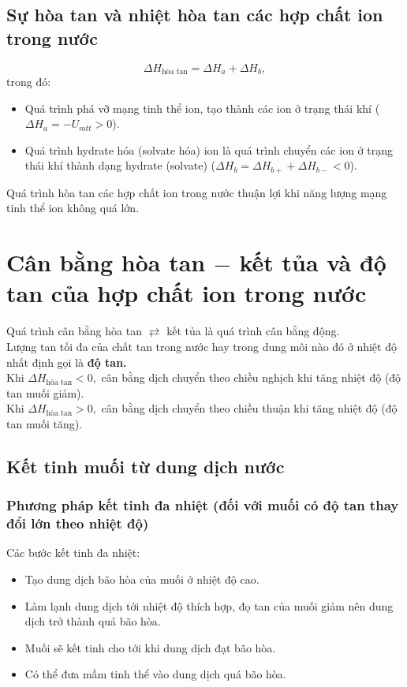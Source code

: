 \subsection{Sự hòa tan và nhiệt hòa tan các hợp chất ion trong nước}
$$\Delta H_{\text{hòa tan}} = \Delta H_a + \Delta H_b,$$
trong đó:
\begin{itemize}
\item Quá trình phá vỡ mạng tinh thể ion, tạo thành các ion ở trạng thái khí ($\Delta H_a = - U_{mtt} > 0$).
\item Quá trình hydrate hóa (solvate hóa) ion là quá trình chuyển các ion ở trạng thái khí thành dạng hydrate (solvate) ($\Delta H_b = \Delta H_{b+} + \Delta H_{b-} < 0$).
\end{itemize}
Quá trình hòa tan các hợp chất ion trong nước thuận lợi khi năng lượng mạng tinh thể ion không quá lớn.
\section{Cân bằng hòa tan $-$ kết tủa và độ tan của hợp chất ion trong nước}
Quá trình cân bằng hòa tan $ \rightleftarrows $ kết tủa là quá trình cân bằng động.\\
Lượng tan tối đa của chất tan trong nước hay trong dung môi nào đó ở nhiệt độ nhất định gọi là \textbf{độ tan.}\\
Khi $\Delta H_{\text{hòa tan}} < 0,$ cân bằng dịch chuyển theo chiều nghịch khi tăng nhiệt độ (độ tan muối giảm).\\
Khi $\Delta H_{\text{hòa tan}} > 0,$ cân bằng dịch chuyển theo chiều thuận khi tăng nhiệt độ (độ tan muối tăng).
\subsection{Kết tinh muối từ dung dịch nước}
\subsubsection{Phương pháp kết tinh đa nhiệt (đối với muối có độ tan thay đổi lớn theo nhiệt độ)}
Các bước kết tinh đa nhiệt:
\begin{itemize}
\item Tạo dung dịch bão hòa của muối ở nhiệt độ cao.
\item Làm lạnh dung dịch tới nhiệt độ thích hợp, đọ tan của muối giảm nên dung dịch trở thành quá bão hòa.
\item Muối sẽ kết tinh cho tới khi dung dịch đạt bão hòa.
\item Có thể đưa mầm tinh thể vào dung dịch quá bão hòa.
\end{itemize}
